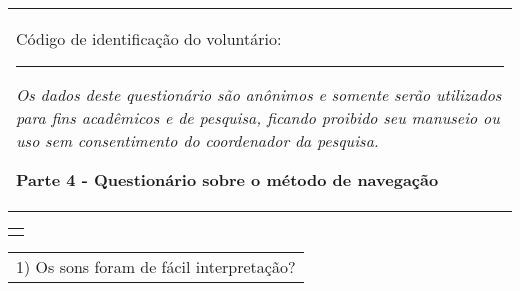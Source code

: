 %
%
%
\begin{table}[!thb]
    \begin{tabular}{m{1\linewidth}}

        {\color{gray}
        
        Código de identificação do voluntário: \rule{1in}{.2mm}
        
        \textit{Os dados deste questionário são anônimos e somente serão utilizados para fins acadêmicos e de pesquisa, ficando proibido seu manuseio ou uso sem consentimento do coordenador da pesquisa.}
        }
        
        \begin{center}
        \textbf{Parte 4 - Questionário sobre o método de navegação}
        \end{center}
        
    \end{tabular}
%
    \begin{tabular}{>{\centering\arraybackslash}m{1\linewidth}}
        {\large TESTE 1 - ORIENTAÇÃO VIA ÁUDIO}
    \end{tabular}
    \vfill
    \begin{tabular}{m{1\linewidth}}
        \vspace{1ex}
        1)	Os sons foram de fácil interpretação?        
    \end{tabular}
        
        


\end{table}
